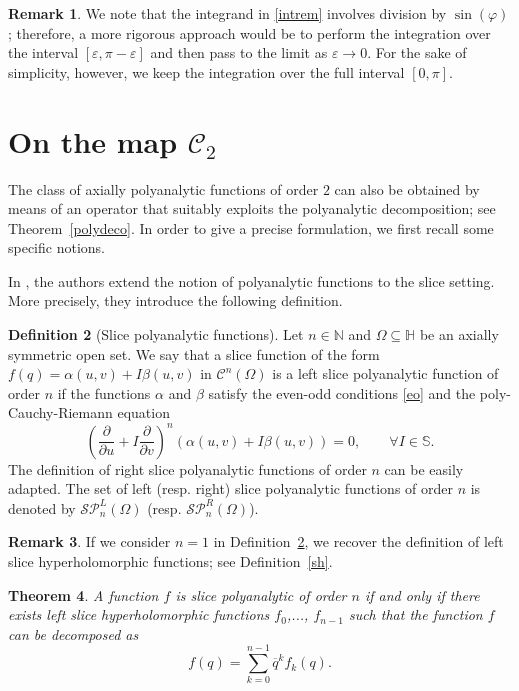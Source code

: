\documentclass[reqno,11pt]{amsart}
\numberwithin{equation}{section}
\newtheorem{theorem}{Theorem}[section]
\theoremstyle{definition}
\newtheorem{remark}[theorem]{{\bf Remark}}
\newtheorem{definition}[theorem]{Definition}
\begin{document}
\begin{remark}
We note that the integrand in \eqref{intrem} involves division by $\sin(\varphi)$; therefore, a more rigorous approach would be to perform the integration over the interval $[\varepsilon, \pi - \varepsilon]$ and then pass to the limit as $\varepsilon \to 0$. For the sake of simplicity, however, we keep the integration over the full interval $[0,\pi]$.
\end{remark}

\section{On the map $\mathcal{C}_2$}


The class of axially polyanalytic functions of order $2$ can also be obtained by means of an operator that suitably exploits the polyanalytic decomposition; see Theorem~\ref{polydeco}. In order to give a precise formulation, we first recall some specific notions.

\medskip

In \cite{ADS, ADS2019, ACDS2}, the authors extend the notion of polyanalytic functions to the slice setting. More precisely, they introduce the following definition.

\begin{definition}[Slice polyanalytic functions]
	\label{slicepoly}
	Let $n \in \mathbb{N}$ and $\Omega \subseteq \mathbb{H}$ be an axially symmetric open set. We say that a slice function of the form $f(q)=\alpha(u,v)+I\beta(u,v)$ in $\mathcal{C}^n(\Omega)$ is a left slice polyanalytic function of order $n$ if the functions $\alpha$ and $\beta$ satisfy the even-odd conditions \eqref{eo} and the poly-Cauchy-Riemann equation
	$$
	\left(\frac{\partial}{\partial u}+I \frac{\partial}{\partial v}\right)^n (\alpha(u,v)+I \beta(u,v))=0, \qquad \forall I \in \mathbb{S}.
	$$
	The definition of right slice polyanalytic functions of order $n$ can be easily adapted. The set of left (resp. right) slice polyanalytic functions of order $n$ is denoted by $\mathcal{SP}_n^L(\Omega)$ (resp. $\mathcal{SP}_n^R(\Omega)$).
\end{definition}

\begin{remark}
	If we consider $n=1$ in Definition~\ref{slicepoly}, we recover the definition of left slice hyperholomorphic functions; see Definition~\ref{sh}.
\end{remark}

\begin{theorem}
	\label{bapoly}
	A function $f$ is slice polyanalytic of order $n$ if and only if there exists left slice hyperholomorphic functions $f_0$,..., $f_{n-1}$ such that the function $f$ can be decomposed as
	$$ f(q)=\sum_{k=0}^{n-1} \overline{q}^k f_k(q).$$
\end{theorem}
\end{document}
